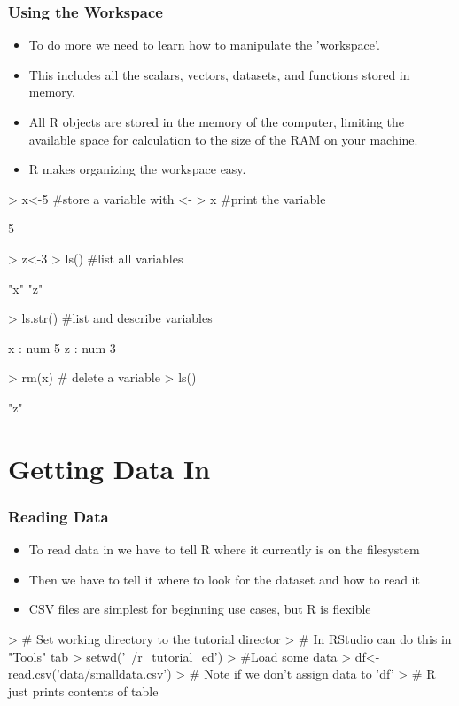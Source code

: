 \documentclass{beamer}
\begin{document}
\begin{frame}[containsverbatim]
\frametitle{Using the Workspace}
  \begin{itemize}
  \item To do more we need to learn how to manipulate the 'workspace'.
  \item This includes all the scalars, vectors, datasets, and functions stored in memory.
  \item All R objects are stored in the memory of the computer, limiting the available space for calculation to the size of the RAM on your machine.
  \item R makes organizing the workspace easy.
  \end{itemize}
\begin{Schunk}
\begin{Sinput}
> x<-5 #store a variable with <-
> x    #print the variable
\end{Sinput}
\begin{Soutput}
[1] 5
\end{Soutput}
\begin{Sinput}
> z<-3 
> ls() #list all variables
\end{Sinput}
\begin{Soutput}
[1] "x" "z"
\end{Soutput}
\begin{Sinput}
> ls.str() #list and describe variables
\end{Sinput}
\begin{Soutput}
x :  num 5
z :  num 3
\end{Soutput}
\begin{Sinput}
> rm(x)    # delete a variable
> ls()
\end{Sinput}
\begin{Soutput}
[1] "z"
\end{Soutput}
\end{Schunk}
\end{frame}

\section{Getting Data In}
\begin{frame}[containsverbatim]
\frametitle{Reading Data}
\begin{itemize}
  \item To read data in we have to tell R where it currently is on the filesystem
  \item Then we have to tell it where to look for the dataset and how to read it
  \item CSV files are simplest for beginning use cases, but R is flexible
\end{itemize}
\begin{Schunk}
\begin{Sinput}
> # Set working directory to the tutorial director
> # In RStudio can do this in "Tools" tab
> setwd('~/r_tutorial_ed')
> #Load some data
> df<-read.csv('data/smalldata.csv')
> # Note if we don't assign data to 'df'
> # R just prints contents of table
\end{Sinput}
\end{Schunk}
\end{frame}
\end{document}
